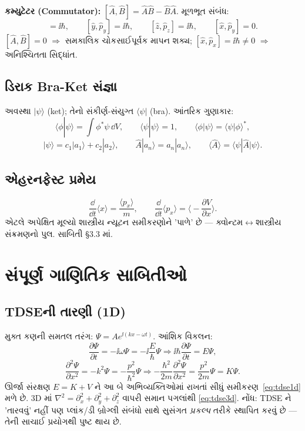 \textbf{કમ્યુટેટર (Commutator):} $[\hat A,\hat B]=\hat A\hat B-\hat B\hat A$. મૂળભૂત સંબંધ:
\begin{equation}
[\hat x,\hat p_x]=\ii\hbar,\qquad [\hat y,\hat p_y]=\ii\hbar,\qquad [\hat z,\hat p_z]=\ii\hbar,
\qquad [\hat x,\hat p_y]=0.
\label{eq:comm}
\end{equation}
$[\hat A,\hat B]=0$ $\Rightarrow$ સમકાલિક ચોકસાઈપૂર્વક માપન શક્ય; $[\hat x,\hat p_x]=\ii\hbar\neq0$ $\Rightarrow$ અનિશ્ચિતતા સિદ્ધાંત.

\subsection{ડિરાક Bra-Ket સંજ્ઞા }
અવસ્થા $|\psi\rangle$ (ket); તેનો સંકીર્ણ-સંયુગ્ત $\langle\psi|$ (bra). આંતરિક ગુણાકાર:
\[
\langle\phi|\psi\rangle=\int\phi^{*}\psi\,\dd V,\qquad
\langle\psi|\psi\rangle=1,\qquad
\langle\phi|\psi\rangle=\langle\psi|\phi\rangle^{*},
\]
\[
|\psi\rangle=c_1|a_1\rangle+c_2|a_2\rangle,\qquad
\hat A|a_n\rangle=a_n|a_n\rangle,\qquad
\langle\hat A\rangle=\langle\psi|\hat A|\psi\rangle .
\]

\subsection{એહરનફેસ્ટ પ્રમેય }
\[
\frac{\dd}{\dd t}\langle x\rangle=\frac{\langle p_x\rangle}{m},
\qquad
\frac{\dd}{\dd t}\langle p_x\rangle=\Big\langle-\frac{\partial V}{\partial x}\Big\rangle .
\]
એટલે અપેક્ષિત મૂલ્યો શાસ્ત્રીય ન્યૂટન સમીકરણોને 'પાળે' છે — ક્વોન્ટમ$\leftrightarrow$શાસ્ત્રીય સંક્રમણનો પુલ. સાબિતી \S3.3 માં.

\section{સંપૂર્ણ ગાણિતિક સાબિતીઓ}
\label{sec:unit3proofs}

\subsection{TDSEની તારણી (1D)}
મુક્ત કણની સમતલ તરંગ: $\Psi=Ae^{\ii(kx-\omega t)}$. આંશિક વિકલન:
\[
\frac{\partial\Psi}{\partial t}=-\ii\omega\Psi=-\ii\frac{E}{\hbar}\Psi
\Rightarrow \ii\hbar\frac{\partial\Psi}{\partial t}=E\Psi,
\]
\[
\frac{\partial^{2}\Psi}{\partial x^{2}}=-k^{2}\Psi=-\frac{p^{2}}{\hbar^{2}}\Psi
\Rightarrow -\frac{\hbar^{2}}{2m}\frac{\partial^{2}\Psi}{\partial x^{2}}=\frac{p^{2}}{2m}\Psi=K\Psi .
\]
ઊર્જા સંરક્ષણ $E=K+V$ ને આ બે અભિવ્યક્તિઓમાં રાખતાં સીધું સમીકરણ~\eqref{eq:tdse1d} મળે છે. 3D માં $\nabla^{2}=\partial_x^{2}+\partial_y^{2}+\partial_z^{2}$ વાપરી સમાન પગલાંથી \eqref{eq:tdse3d}. નોંધ: TDSE ને 'તારવવું' નહીં પણ પ્લાંક/ડી બ્રોગ્લી સંબંધો સાથે સુસંગત \emph{પ્રકલ્પ} તરીકે સ્થાપિત કરવું છે — તેની સાચાઈ પ્રયોગથી પુષ્ટ થાય છે.


